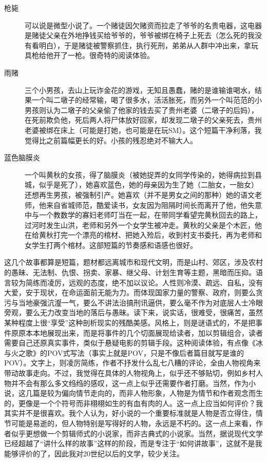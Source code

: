\begin{description}
    \item[枪毙] 可以说是微型小说了。一个赌徒因欠赌资而拉走了爷爷的名贵电器，这电器是赌徒父亲在外地挣钱买给爷爷的，爷爷被绑在椅子上死去（怎么死的我没有看明白），于是赌徒被警察抓住，执行死刑，弟弟从人群中冲出来，拿玩具枪给他开了一枪。很奇特的阅读体验。
    \item[雨赌] 三个小男孩，去山上玩诈金花的游戏，无知且愚蠢，赌的是谁输谁喝水，结果一个叫二墩子的经常输，喝了很多水，活活胀死，而另外一个叫范范的小男孩则认为二墩子的父亲偷了他家的钱去买了贵州老婆（二墩子的后妈），在死前欺负他，死后两人将尸体放好回家，却发现二墩子的父亲死去，贵州老婆被绑在床上（可能是打她，也可能是在玩SM）。这个短篇干净利落，我觉得比之前篇幅更长的好。小孩的残忍绝对不输大人。
    \item[蓝色脑膜炎] 一个叫黄秋的女孩，得了脑膜炎（被她捉弄的女同学传染的，她得病拉到县城，似乎是死了），她喜欢蓝色，她的母亲因为生了她（二胎女，一胎女）还想再生男孩，被强制引产。她喜欢（并不是男女之间的那种）她的语文老师，他来自省城师范，酷爱读书，女友因为阻隔时间长而离开了他，他失意中与一个教数学的寡妇老师叮当在一起，在带同学看望完黄秋回去的路上，过河时发生山洪，老师和另外一个女学生被冲走。黄秋的父亲是个木匠，他在给黄秋打完一个漂亮的棺材、把她入殓后，收到村支书委托，再为老师和女学生打两个棺材。这部短篇的节奏感和语感也很好。
\end{description}

这几个故事都算是短篇，题材都远离城市和现代文明，而是山村、郊区，涉及农村的愚昧、无法制、仇恨、拐卖、家暴、继父母、计划生育等主题，黑暗而压抑。语言较为简练而凌厉，远观的态度，绝不加以议论。人性则冷漠、疏远、自私，没有大爱，安于现状，在命运面前无能为力。而体现国家力量的警察、政府，则要么贪污与当地豪强沆瀣一气，要么不讲法治搞刑讯逼供，要么毫不作为对底层人士冷眼旁观，要么无力改变当地的落后与愚昧。读下来，说实话，很难受，很痛苦，虽然某种程度上很“享受”这种剖析现实的残酷美感。风格上，则是谜语式的，不是把事件原原本本地展现出来，而是将事件的几个切面展现给读者，加以剪辑组合，读者需要自己还原真实事件，类似于悬疑电影的剪辑手段。这种阅读体验，有点像《冰与火之歌》的POV式写法（事实上就是POV，只是不像后者篇目就写是谁的POV）。文字上，则凌厉简练，作者不抒发什么乱七八糟的评论，全由人物视角来带动故事走向。不过，我觉得在具体的人物视角上，似乎还不够贴切，例如乡村人物并不会有那么多文绉绉的感叹，这一点上似乎还需要作者打磨。当然，作为小说，这几篇是较为偏向情节走向的，而非人物形象，人物是为情节和作者观念而生的，更像是一个个符号而非栩栩如生的有血有肉的人。这一点上应当如何评价？我其实并不是很喜欢。我个人认为，好小说的一个重要标准就是人物是否立得住，情节可能是易逝的，但人物特别是写得好的人物，永远是不朽的。这一点上来看，作者似乎更想做一个剪辑师式的小说家，而非古典式的小说家。当然，据说现代文学已经超越了“讲什么样的故事”这样的阶段，而是专注于“如何讲故事”，这就不是我能够评价的了，因此我对20世纪以后的文学，较少关注。

